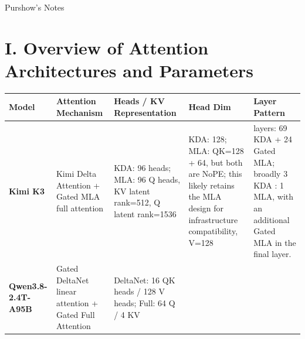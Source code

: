 \documentclass[
  a4paper,
  10pt]{article}
\author{}
\date{}
\newcounter{none} %
\begin{document}
\clearpage{}\begin{landscape}\thispagestyle{empty}\noindent\hfill{\small\sffamily\color{attentiongray}Purshow's Notes}\par\vspace{-0.6em}

\section{I. Overview of Attention Architectures and
Parameters}\label{i.-overview-of-attention-architectures-and-parameters}

{\def\LTcaptype{none} %
\begin{longtable}[]{@{}
  >{\raggedright\arraybackslash}p{}
  >{\raggedright\arraybackslash}p{}
  >{\raggedright\arraybackslash}p{}
  >{\raggedright\arraybackslash}p{}
  >{\raggedright\arraybackslash}p{}@{}}
\toprule\noalign{}
\begin{minipage}[b]{\linewidth}\raggedright
Model
\end{minipage} & \begin{minipage}[b]{\linewidth}\raggedright
Attention Mechanism
\end{minipage} & \begin{minipage}[b]{\linewidth}\raggedright
Heads / KV Representation
\end{minipage} & \begin{minipage}[b]{\linewidth}\raggedright
Head Dim
\end{minipage} & \begin{minipage}[b]{\linewidth}\raggedright
Layer Pattern
\end{minipage} \\
\midrule\noalign{}
\endhead
\bottomrule\noalign{}
\endlastfoot
\textbf{Kimi K3} & Kimi Delta Attention + Gated MLA full attention &
KDA: 96 heads; MLA: 96 Q heads, KV latent rank=512, Q latent rank=1536 &
KDA: 128; MLA: QK=128 + 64, but both are NoPE; this likely retains the
MLA design for infrastructure compatibility, V=128 & 93 layers: 69 KDA +
24 Gated MLA; broadly 3 KDA : 1 MLA, with an additional Gated MLA in the
final layer. \\
\textbf{Qwen3.8-2.4T-A95B} & Gated DeltaNet linear attention + Gated
Full Attention & DeltaNet: 16 QK heads / 128 V heads; Full: 64 Q / 4 KV

\end{longtable}}
\end{landscape}
\end{document}
